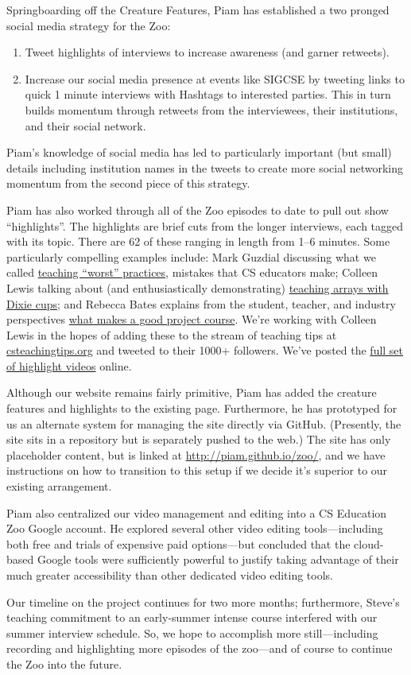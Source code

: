 \documentclass[11pt]{article}
\begin{document}
Springboarding off the Creature Features, Piam has established a two
pronged social media strategy for the Zoo:
\begin{enumerate}
\item Tweet highlights of interviews to increase awareness (and garner
   retweets).
\item Increase our social media presence at events like SIGCSE by
   tweeting links to quick 1 minute interviews with Hashtags to
   interested parties. This in turn builds momentum through retweets
   from the interviewees, their institutions, and their social
   network.
\end{enumerate}
Piam's knowledge of social media has led to particularly important
(but small) details including institution names in the tweets to
create more social networking momentum from the second piece of this
strategy.

Piam has also worked through all of the Zoo episodes to date to pull
out show ``highlights''. The highlights are brief cuts from the longer
interviews, each tagged with its topic. There are 62 of these ranging
in length from 1--6 minutes. Some particularly compelling examples
include: Mark Guzdial discussing what we called \href{https://youtu.be/ZpxxwZ9f_bo}{teaching ``worst'' practices}, mistakes that CS educators make; Colleen Lewis talking
about (and enthusiastically demonstrating) \href{https://youtu.be/3BVAaGWHD4I}{teaching arrays with Dixie cups}; and Rebecca Bates explains from the student, teacher, and
industry perspectives \href{https://youtu.be/f_0lbxv59iY}{what makes a good project course}. We're working
with Colleen Lewis in the hopes of adding these to the stream of
teaching tips at \href{http://www.csteachingtips.org}{csteachingtips.org} and tweeted to their 1000+
followers. We've posted the \href{https://goo.gl/jBrMBf}{full set of highlight videos}
online.

Although our website remains fairly primitive, Piam has added the
creature features and highlights to the existing page. Furthermore, he
has prototyped for us an alternate system for managing the site
directly via GitHub. (Presently, the site sits in a repository but is
separately pushed to the web.) The site has only placeholder content,
but is linked at \href{http://piam.github.io/zoo/}{http://piam.github.io/zoo/}, and we have instructions
on how to transition to this setup if we decide it's superior to our
existing arrangement.

Piam also centralized our video management and editing into a CS
Education Zoo Google account. He explored several other video editing
tools---including both free and trials of expensive paid options---but
concluded that the cloud-based Google tools were sufficiently powerful
to justify taking advantage of their much greater accessibility than
other dedicated video editing tools.

Our timeline on the project continues for two more months;
furthermore, Steve's teaching commitment to an early-summer intense
course interfered with our summer interview schedule. So, we hope to
accomplish more still---including recording and highlighting more
episodes of the zoo---and of course to continue the Zoo into the
future.
\end{document}
